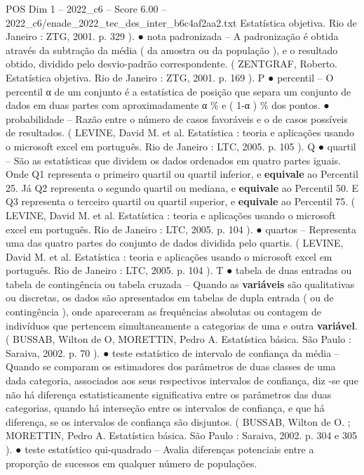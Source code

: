 \begin{textsample}{POS Dim 1 – 2022\_c6 – Score 6.00 – 2022\_c6/enade\_2022\_tec\_des\_inter\_b6c4af2aa2.txt}
Estatística objetiva.
Rio de Janeiro : ZTG, 2001. p. 329 ). {\EmojiFont ●} nota padronizada – A padronização é obtida através da subtração da média ( da amostra ou da população ), e o resultado obtido, dividido pelo desvio-padrão correspondente. ( ZENTGRAF, Roberto.
Estatística objetiva.
Rio de Janeiro : ZTG, 2001. p. 169 ).
P {\EmojiFont ●} percentil – O percentil α de um conjunto é a estatística de posição que separa um conjunto de dados em duas partes com aproximadamente α \% e ( 1-α ) \% dos pontos. {\EmojiFont ●} probabilidade – Razão entre o número de casos favoráveis e o de casos possíveis de resultados. ( LEVINE, David M. et al.
Estatística : teoria e aplicações usando o microsoft excel em português.
Rio de Janeiro : LTC, 2005. p. 105 ).
Q {\EmojiFont ●} quartil – São as estatísticas que dividem os dados ordenados em quatro partes iguais.
Onde Q1 representa o primeiro quartil ou quartil inferior, e \textbf{equivale} ao Percentil 25.
Já Q2 representa o segundo quartil ou mediana, e \textbf{equivale} ao Percentil 50.
E Q3 representa o terceiro quartil ou quartil superior, e \textbf{equivale} ao Percentil 75. ( LEVINE, David M. et al.
Estatística : teoria e aplicações usando o microsoft excel em português.
Rio de Janeiro : LTC, 2005. p. 104 ). {\EmojiFont ●} quartos – Representa uma das quatro partes do conjunto de dados dividida pelo quartis. ( LEVINE, David M. et al.
Estatística : teoria e aplicações usando o microsoft excel em português.
Rio de Janeiro : LTC, 2005. p. 104 ).
T {\EmojiFont ●} tabela de duas entradas ou tabela de contingência ou tabela cruzada – Quando as \textbf{variáveis} são qualitativas ou discretas, os dados são apresentados em tabelas de dupla entrada ( ou de contingência ), onde apareceram as frequências absolutas ou contagem de indivíduos que pertencem simultaneamente a categorias de uma e outra \textbf{variável}. ( BUSSAB, Wilton de O, MORETTIN, Pedro A.
Estatística básica.
São Paulo : Saraiva, 2002. p. 70 ). {\EmojiFont ●} teste estatístico de intervalo de confiança da média – Quando se comparam os estimadores dos parâmetros de duas classes de uma dada categoria, associados aos seus respectivos intervalos de confiança, diz -se que não há diferença estatisticamente significativa entre os parâmetros das duas categorias, quando há interseção entre os intervalos de confiança, e que há diferença, se os intervalos de confiança são disjuntos. ( BUSSAB, Wilton de O. ; MORETTIN, Pedro A.
Estatística básica.
São Paulo : Saraiva, 2002. p. 304 e 305 ). {\EmojiFont ●} teste estatístico qui-quadrado – Avalia diferenças potenciais entre a proporção de sucessos em qualquer número de populações.

\end{textsample}
